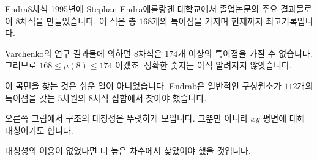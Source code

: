 \begin{surferPage}[Endraß의 $8$차식]{Endra $8$차식}
     1995년에 Stephan Endra 에를랑겐 대학교에서 졸업논문의 주요 결과물로 이 $8$차식을 만들었습니다. 이 식은 총 $168$개의 특이점을 가지며 현재까지 최고기록입니다.

    Varchenko의 연구 결과물에 의하면 $8$차식은 $174$개 이상의 특이점을 가질 수 없습니다. 그러므로 $168 \le \mu(8) \le 174$ 이겠죠. 정확한 숫자는 아직 알려지지 않앗습니다.

    이 곡면을 찾는 것은 쉬운 일이 아니었습니다. Endrab은 일반적인 구성원소가 $112$개의 특이점을 갖는 $5$차원의 $8$차식 집합에서 찾아야 했습니다. 
 

    오른쪽 그림에서 구조의 대칭성은 뚜렷하게 보입니다. 그뿐만 아니라 $xy$ 평면에 대해 대칭이기도 합니다. 

    대칭성의 이용이 없었다면 더 높은 차수에서 찾았어야 했을 것입니다.
\end{surferPage}
